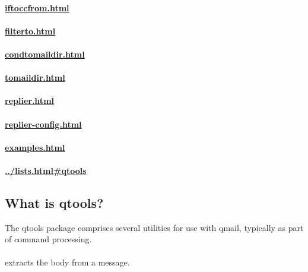 \documentclass{book}
\begin{document}
\paragraph{\href{The \cmd{iftoccfrom} program}{iftoccfrom.html}}

\paragraph{\href{The \cmd{filterto} program}{filterto.html}}

\paragraph{\href{The \cmd{condtomaildir} program}{condtomaildir.html}}
\paragraph{\href{The \cmd{tomaildir} program}{tomaildir.html}}

\paragraph{\href{The \cmd{replier} program}{replier.html}}
\paragraph{\href{The \cmd{replier-config} program}{replier-config.html}}

\paragraph{\href{Examples}{examples.html}}

\paragraph{\href{A mailing list for qtools discussion}{../lists.html\#qtools}}


\subsection{What is qtools?}
The qtools package comprises several utilities for use with qmail,
typically as part of  command processing.

\paragraph{} extracts the body from a message.
\end{document}
